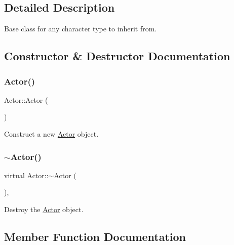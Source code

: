 \subsection{Detailed Description}
Base class for any character type to inherit from. 



\subsection{Constructor \& Destructor Documentation}
\mbox{\label{classActor_a2a0ff4335a1ee9096df90f288c026c8b}} 
\subsubsection{\texorpdfstring{Actor()}{Actor()}}
{\footnotesize\ttfamily Actor\+::\+Actor (\begin{DoxyParamCaption}{ }\end{DoxyParamCaption})}



Construct a new \mbox{\hyperlink{classActor}{Actor}} object. 

\mbox{\label{classActor_a4e8d9d909ec2c3d3205682e83bf8ff18}} 
\subsubsection{\texorpdfstring{$\sim$Actor()}{~Actor()}}
{\footnotesize\ttfamily virtual Actor\+::$\sim$\+Actor (\begin{DoxyParamCaption}{ }\end{DoxyParamCaption})\hspace{0.3cm}{\ttfamily [virtual]}, {\ttfamily [default]}}



Destroy the \mbox{\hyperlink{classActor}{Actor}} object. 



\subsection{Member Function Documentation}
\mbox{\label{classActor_af73a6f6670f0507c9e55ec2f61293535}} 
